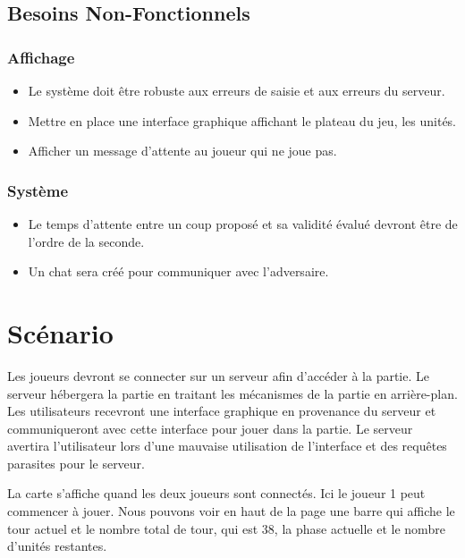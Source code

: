 \subsection{Besoins Non-Fonctionnels}

\subsubsection{Affichage}
\begin{itemize}
    \item Le système doit être robuste aux erreurs de saisie et aux erreurs du serveur.
    \item Mettre en place une interface graphique affichant le plateau du jeu, les unités.
    \item Afficher un message d'attente au joueur qui ne joue pas.
\end{itemize}

\subsubsection{Système}
\begin{itemize}
    \item Le temps d'attente entre un coup proposé et sa validité évalué devront être de l'ordre de la seconde.
    \item Un chat sera créé pour communiquer avec l'adversaire.
\end{itemize}

\section{Scénario}

Les joueurs devront se connecter sur un serveur afin d'accéder à la partie. Le serveur hébergera la partie en traitant les mécanismes de la partie en arrière-plan. Les utilisateurs recevront une interface graphique en provenance du serveur et communiqueront avec cette interface pour jouer dans la partie.
Le serveur avertira l'utilisateur lors d'une mauvaise utilisation de l'interface et des requêtes parasites pour le serveur.




La carte s'affiche quand les deux joueurs sont connectés. Ici le joueur 1 peut commencer à jouer.
Nous pouvons voir en haut de la page une barre qui affiche le tour actuel et le nombre total de tour, qui est 38, la phase actuelle et le nombre d'unités restantes.

